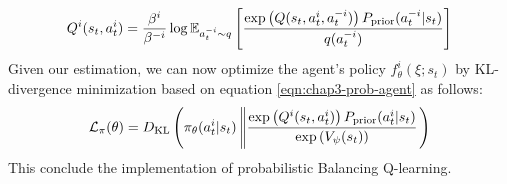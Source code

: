 \begin{equation}
    Q^i(s_t, a^{i}_t) = \frac{\beta^{i}}{\beta^{-i}}\log \mathbb{E}_{a^{-i}_t \sim q}\left[ \frac{\exp\left( Q(s_t, a^{i}_t, a^{-i}_t) \right) P_{\text{prior}}(a^{-i}_t | s_t)}{q(a^{-i}_t)} \right]
\end{equation}
Given our estimation, we can now optimize the agent's policy $f^{i}_\theta(\xi ; s_t)$ by KL-divergence minimization based on equation \ref{eqn:chap3-prob-agent} as follows:
\begin{equation}
    \mathcal{L}_\pi(\theta) = D_{\mathrm{KL}}\left( \pi_\theta(a^{i}_t | s_t) \left\| \frac{\exp \left( Q^i(s_t, a^{i}_t) \right) P_{\text{prior}}(a^i_t | s_t)}{\exp\left( V_\psi(s_t) \right)} \right. \right)
\end{equation}
This conclude the implementation of probabilistic Balancing Q-learning.

